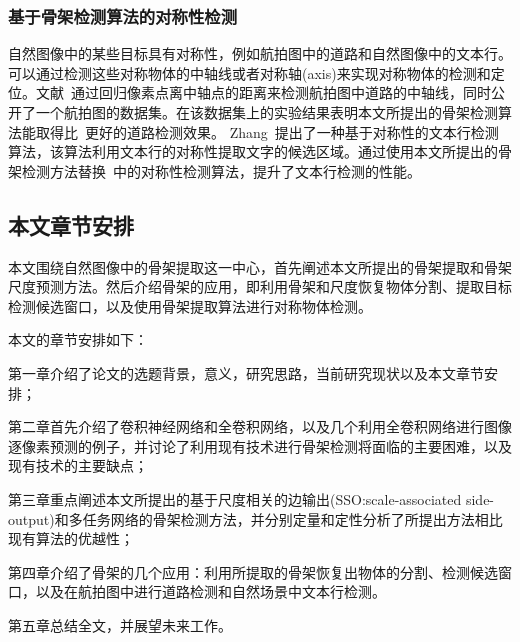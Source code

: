 \documentclass[UTF8]{ctexart}
\numberwithin{equation}{section} %
\numberwithin{table}{section} %
\begin{document}
\subsubsection{基于骨架检测算法的对称性检测}
自然图像中的某些目标具有对称性，例如航拍图中的道路和自然图像中的文本行。可以通过检测这些对称物体的中轴线或者对称轴(axis)来实现对称物体的检测和定位。文献~\cite{sironi2014multiscale}通过回归像素点离中轴点的距离来检测航拍图中道路的中轴线，同时公开了一个航拍图的数据集。在该数据集上的实验结果表明本文所提出的骨架检测算法能取得比~\cite{sironi2014multiscale}更好的道路检测效果。
Zhang~\cite{Zhang15}提出了一种基于对称性的文本行检测算法，该算法利用文本行的对称性提取文字的候选区域。通过使用本文所提出的骨架检测方法替换~\cite{Zhang15}中的对称性检测算法，提升了文本行检测的性能。

\subsection{本文章节安排}
本文围绕自然图像中的骨架提取这一中心，首先阐述本文所提出的骨架提取和骨架尺度预测方法。然后介绍骨架的应用，即利用骨架和尺度恢复物体分割、提取目标检测候选窗口，以及使用骨架提取算法进行对称物体检测。

本文的章节安排如下：

第一章介绍了论文的选题背景，意义，研究思路，当前研究现状以及本文章节安排；

第二章首先介绍了卷积神经网络和全卷积网络，以及几个利用全卷积网络进行图像逐像素预测的例子，并讨论了利用现有技术进行骨架检测将面临的主要困难，以及现有技术的主要缺点；

第三章重点阐述本文所提出的基于尺度相关的边输出(SSO:scale-associated side-output)和多任务网络的骨架检测方法，并分别定量和定性分析了所提出方法相比现有算法的优越性；

第四章介绍了骨架的几个应用：利用所提取的骨架恢复出物体的分割、检测候选窗口，以及在航拍图中进行道路检测和自然场景中文本行检测。

第五章总结全文，并展望未来工作。


\pagebreak
\end{document}

